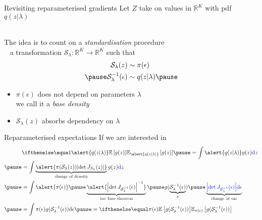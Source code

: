 \documentclass[14pt,dvipsnames]{beamer}
\begin{document}
\begin{frame}{Revisiting reparameterised gradients}
	Let $Z$ take on values in $\mathbb R^K$ with pdf $q(z|\lambda)$ \\
	
	~ \pause

	The idea is to count on a \emph{standardisation} procedure\\ \pause
	~ a transformation $\mathcal S_\lambda: \mathbb R^K \to \mathbb R^K$ such that \pause
	\begin{equation*}
	\begin{aligned}
	\mathcal S_\lambda(z) &\sim \pi(\epsilon) \\ \pause
 	\inv{\mathcal S}_\lambda(\epsilon) &\sim q(z|\lambda) \pause
	\end{aligned}
	\end{equation*} 
	\begin{itemize}
		\item $\pi(\epsilon)$ does not depend on parameters $\lambda$\\
		we call it a \emph{base density} \pause
		\item $\mathcal S_\lambda(z)$ absorbs dependency on $\lambda$ 
	\end{itemize}

\end{frame}

\begin{frame}{Reparameterised expectations}
	If we are interested in 
	\begin{equation*}
	\begin{aligned}
		&  \E[\alert{q(z|\lambda)}]{g(z)} \pause = \int \alert{q(z|\lambda)} g(z) \textcolor{blue}{\dd z} \\ \pause
		&= \int \underbrace{\alert{\pi(\mathcal S_\lambda(z)) \djac{S_\lambda}{z}}}_{\text{change of density}} g(z) \textcolor{blue}{\dd z} \\ \pause
		&= \int \alert{\pi(\epsilon)} \pause \underbrace{\alert{\djac{\inv{\mathcal S}_\lambda}{\epsilon}^{-1}}}_{\text{inv func theorem}} \pause g(\underbrace{\inv{\mathcal S}_\lambda(\epsilon)}_{z}) \pause \underbrace{\textcolor{blue}{\djac{\inv{\mathcal S}_\lambda}{\epsilon} \dd \epsilon}}_{\text{change of var}} \\ \pause
		&= \int \pi(\epsilon) g(\inv{\mathcal S}_\lambda(\epsilon))\dd \epsilon \pause = \E[\pi(\epsilon)]{g(\inv{\mathcal S}_\lambda(\epsilon)) }
	\end{aligned}
	\end{equation*}
\end{frame}
\end{document}
